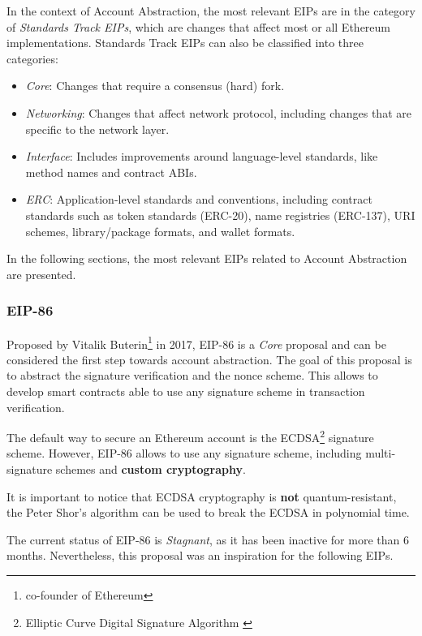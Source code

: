 In the context of Account Abstraction, the most relevant EIPs are in the category of \textit{Standards Track EIPs}, which are changes that affect most or all Ethereum implementations. Standards Track EIPs can also be classified into three categories: \cite{eip-1}
\begin{itemize}
    \item \textit{Core}: Changes that require a consensus (hard) fork.
    \item \textit{Networking}: Changes that affect network protocol, including changes that are specific to the network layer.
    \item \textit{Interface}: Includes improvements around language-level standards, like method names and contract ABIs.
    \item \textit{ERC}: Application-level standards and conventions, including contract standards such as token standards (ERC-20), name registries (ERC-137), URI schemes, library/package formats, and wallet formats.
\end{itemize}

In the following sections, the most relevant EIPs related to Account Abstraction are presented.

\subsubsection{EIP-86}
\label{subsubsec:eip-86}

Proposed by Vitalik Buterin\footnote{co-founder of Ethereum} in 2017, EIP-86 is a \textit{Core} proposal and can be considered the first step towards account abstraction. The goal of this proposal is to abstract the signature verification and the nonce scheme. This allows to develop smart contracts able to use any signature scheme in transaction verification. \cite{eip-86}

The default way to secure an Ethereum account is the ECDSA\footnote{Elliptic Curve Digital Signature Algorithm \cite{ECDSA}} signature scheme. However, EIP-86 allows to use any signature scheme, including multi-signature schemes and \textbf{custom cryptography}. \cite{eip-86}

It is important to notice that ECDSA cryptography is \textbf{not} quantum-resistant, the Peter Shor's algorithm can be used to break the ECDSA in polynomial time. \cite{stewart2018committing}

The current status of EIP-86 is \textit{Stagnant}, as it has been inactive for more than 6 months. Nevertheless, this proposal was an inspiration for the following EIPs.

